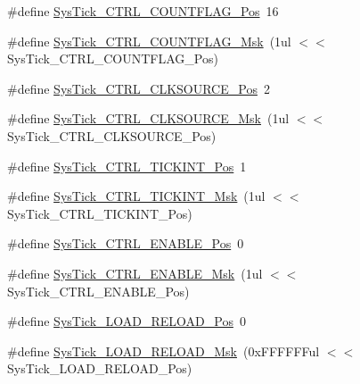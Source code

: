 \begin{DoxyCompactItemize}
\item 
\#define \mbox{\hyperlink{group___c_m_s_i_s___c_m3___sys_tick_gadbb65d4a815759649db41df216ed4d60}{Sys\+Tick\+\_\+\+C\+T\+R\+L\+\_\+\+C\+O\+U\+N\+T\+F\+L\+A\+G\+\_\+\+Pos}}~16
\item 
\#define \mbox{\hyperlink{group___c_m_s_i_s___c_m3___sys_tick_ga1bf3033ecccf200f59baefe15dbb367c}{Sys\+Tick\+\_\+\+C\+T\+R\+L\+\_\+\+C\+O\+U\+N\+T\+F\+L\+A\+G\+\_\+\+Msk}}~(1ul $<$$<$ Sys\+Tick\+\_\+\+C\+T\+R\+L\+\_\+\+C\+O\+U\+N\+T\+F\+L\+A\+G\+\_\+\+Pos)
\item 
\#define \mbox{\hyperlink{group___c_m_s_i_s___c_m3___sys_tick_ga24fbc69a5f0b78d67fda2300257baff1}{Sys\+Tick\+\_\+\+C\+T\+R\+L\+\_\+\+C\+L\+K\+S\+O\+U\+R\+C\+E\+\_\+\+Pos}}~2
\item 
\#define \mbox{\hyperlink{group___c_m_s_i_s___c_m3___sys_tick_gaa41d06039797423a46596bd313d57373}{Sys\+Tick\+\_\+\+C\+T\+R\+L\+\_\+\+C\+L\+K\+S\+O\+U\+R\+C\+E\+\_\+\+Msk}}~(1ul $<$$<$ Sys\+Tick\+\_\+\+C\+T\+R\+L\+\_\+\+C\+L\+K\+S\+O\+U\+R\+C\+E\+\_\+\+Pos)
\item 
\#define \mbox{\hyperlink{group___c_m_s_i_s___c_m3___sys_tick_ga88f45bbb89ce8df3cd2b2613c7b48214}{Sys\+Tick\+\_\+\+C\+T\+R\+L\+\_\+\+T\+I\+C\+K\+I\+N\+T\+\_\+\+Pos}}~1
\item 
\#define \mbox{\hyperlink{group___c_m_s_i_s___c_m3___sys_tick_ga95bb984266ca764024836a870238a027}{Sys\+Tick\+\_\+\+C\+T\+R\+L\+\_\+\+T\+I\+C\+K\+I\+N\+T\+\_\+\+Msk}}~(1ul $<$$<$ Sys\+Tick\+\_\+\+C\+T\+R\+L\+\_\+\+T\+I\+C\+K\+I\+N\+T\+\_\+\+Pos)
\item 
\#define \mbox{\hyperlink{group___c_m_s_i_s___c_m3___sys_tick_ga0b48cc1e36d92a92e4bf632890314810}{Sys\+Tick\+\_\+\+C\+T\+R\+L\+\_\+\+E\+N\+A\+B\+L\+E\+\_\+\+Pos}}~0
\item 
\#define \mbox{\hyperlink{group___c_m_s_i_s___c_m3___sys_tick_ga16c9fee0ed0235524bdeb38af328fd1f}{Sys\+Tick\+\_\+\+C\+T\+R\+L\+\_\+\+E\+N\+A\+B\+L\+E\+\_\+\+Msk}}~(1ul $<$$<$ Sys\+Tick\+\_\+\+C\+T\+R\+L\+\_\+\+E\+N\+A\+B\+L\+E\+\_\+\+Pos)
\item 
\#define \mbox{\hyperlink{group___c_m_s_i_s___c_m3___sys_tick_gaf44d10df359dc5bf5752b0894ae3bad2}{Sys\+Tick\+\_\+\+L\+O\+A\+D\+\_\+\+R\+E\+L\+O\+A\+D\+\_\+\+Pos}}~0
\item 
\#define \mbox{\hyperlink{group___c_m_s_i_s___c_m3___sys_tick_ga265912a7962f0e1abd170336e579b1b1}{Sys\+Tick\+\_\+\+L\+O\+A\+D\+\_\+\+R\+E\+L\+O\+A\+D\+\_\+\+Msk}}~(0x\+F\+F\+F\+F\+F\+Ful $<$$<$ Sys\+Tick\+\_\+\+L\+O\+A\+D\+\_\+\+R\+E\+L\+O\+A\+D\+\_\+\+Pos)
$$
\end{DoxyCompactItemize}
